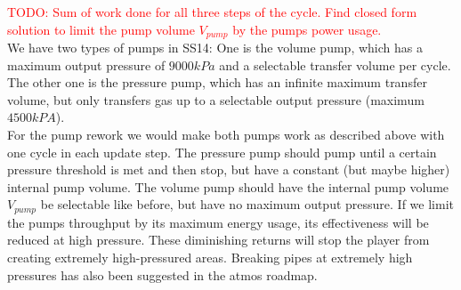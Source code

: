 \documentclass[12pt,a4paper]{article}
\newcommand\todo[1]{\textcolor{red}{TODO: #1}}
\numberwithin{equation}{section}
\begin{document}
\todo{Sum of work done for all three steps of the cycle. Find closed form solution to limit the pump volume $V_{pump}$ by the pumps power usage.}
\\
We have two types of pumps in SS14: One is the volume pump, which has a maximum output pressure of $9000 kPa$ and a selectable transfer volume per cycle. The other one is the pressure pump, which has an infinite maximum transfer volume, but only transfers gas up to a selectable output pressure (maximum $4500kPA$).
\\
For the pump rework we would make both pumps work as described above with one cycle in each update step. The pressure pump should pump until a certain pressure threshold is met and then stop, but have a constant (but maybe higher) internal pump volume. The volume pump should have the internal pump volume $V_{pump}$ be selectable like before, but have no maximum output pressure. If we limit the pumps throughput by its maximum energy usage, its effectiveness will be reduced at high pressure. These diminishing returns will stop the player from creating extremely high-pressured areas. Breaking pipes at extremely high pressures has also been suggested in the atmos roadmap.
\end{document}

